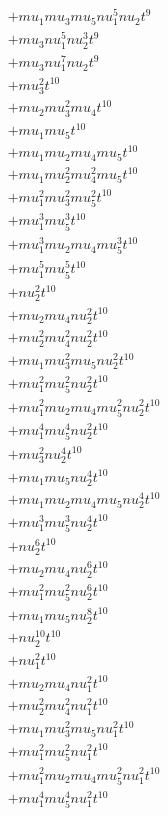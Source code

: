 \begin{align*}
  + mu_1 mu_3 mu_5 nu_1^{5} nu_2 t^{9} \\
  + mu_3 nu_1^{5} nu_2^{3} t^{9} \\
  + mu_3 nu_1^{7} nu_2 t^{9} \\
  + mu_3^{2} t^{10} \\
  + mu_2 mu_3^{2} mu_4 t^{10} \\
  + mu_1 mu_5 t^{10} \\
  + mu_1 mu_2 mu_4 mu_5 t^{10} \\
  + mu_1 mu_2^{2} mu_4^{2} mu_5 t^{10} \\
  + mu_1^{2} mu_3^{2} mu_5^{2} t^{10} \\
  + mu_1^{3} mu_5^{3} t^{10} \\
  + mu_1^{3} mu_2 mu_4 mu_5^{3} t^{10} \\
  + mu_1^{5} mu_5^{5} t^{10} \\
  + nu_2^{2} t^{10} \\
  + mu_2 mu_4 nu_2^{2} t^{10} \\
  + mu_2^{2} mu_4^{2} nu_2^{2} t^{10} \\
  + mu_1 mu_3^{2} mu_5 nu_2^{2} t^{10} \\
  + mu_1^{2} mu_5^{2} nu_2^{2} t^{10} \\
  + mu_1^{2} mu_2 mu_4 mu_5^{2} nu_2^{2} t^{10} \\
  + mu_1^{4} mu_5^{4} nu_2^{2} t^{10} \\
  + mu_3^{2} nu_2^{4} t^{10} \\
  + mu_1 mu_5 nu_2^{4} t^{10} \\
  + mu_1 mu_2 mu_4 mu_5 nu_2^{4} t^{10} \\
  + mu_1^{3} mu_5^{3} nu_2^{4} t^{10} \\
  + nu_2^{6} t^{10} \\
  + mu_2 mu_4 nu_2^{6} t^{10} \\
  + mu_1^{2} mu_5^{2} nu_2^{6} t^{10} \\
  + mu_1 mu_5 nu_2^{8} t^{10} \\
  + nu_2^{10} t^{10} \\
  + nu_1^{2} t^{10} \\
  + mu_2 mu_4 nu_1^{2} t^{10} \\
  + mu_2^{2} mu_4^{2} nu_1^{2} t^{10} \\
  + mu_1 mu_3^{2} mu_5 nu_1^{2} t^{10} \\
  + mu_1^{2} mu_5^{2} nu_1^{2} t^{10} \\
  + mu_1^{2} mu_2 mu_4 mu_5^{2} nu_1^{2} t^{10} \\
  + mu_1^{4} mu_5^{4} nu_1^{2} t^{10} \\

\end{align*}

